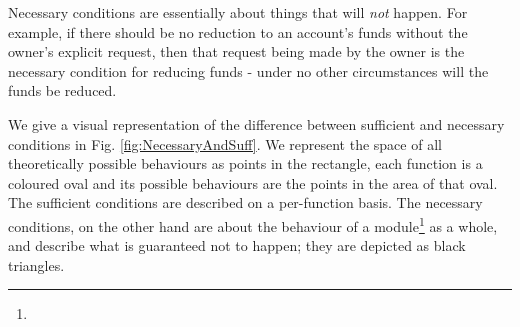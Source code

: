 Necessary conditions are essentially about things that will  \emph{not} happen. For example,
if there should be no reduction to an account's funds without the
owner's explicit request, then that request being made by
the owner is the necessary condition for reducing funds - under no
other circumstances will the funds be reduced. 

We give a visual representation of the difference between sufficient and necessary conditions in 
Fig. \ref{fig:NecessaryAndSuff}. We
represent the space of all theoretically possible behaviours as points in the rectangle, 
each function is a coloured oval and its possible behaviours are the points in the area of that oval.  
The sufficient conditions are described on a per-function basis. 
The necessary conditions, on the other hand are about the behaviour of a module\footnote{} 
as a whole, 
and describe what is guaranteed not to happen;
they are depicted as black triangles. 


